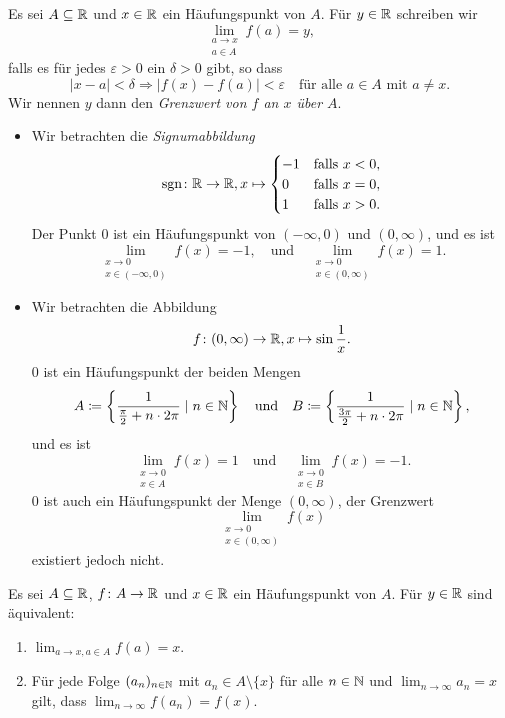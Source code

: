 \documentclass[a4paper,10pt]{article}
\begin{document}
\begin{defi}
 Es sei $A \subseteq \mathbb{R}$ und $x \in \mathbb{R}$ ein Häufungspunkt von $A$. Für $y \in \mathbb{R}$ schreiben wir
 \[
  \lim_{\substack{a \to x \\ a \in A}} f(a) = y,
 \]
 falls es für jedes $\varepsilon > 0$ ein $\delta > 0$ gibt, so dass
 \[
  |x-a| < \delta \Rightarrow |f(x)-f(a)| < \varepsilon
  \quad
  \text{für alle $a \in A$ mit $a \neq x$}.
 \]
 Wir nennen $y$ dann den \emph{Grenzwert von $f$ an $x$ über $A$}.
\end{defi}


\begin{bsp}
 \begin{itemize}
  \item
   Wir betrachten die \emph{Signumabbildung}
   \[
    \operatorname{sgn} \colon \mathbb{R} \to \mathbb{R},
    x \mapsto
    \begin{cases}
     -1 & \text{falls $x < 0$}, \\
      0 & \text{falls $x = 0$}, \\
      1 & \text{falls $x > 0$}.
    \end{cases}
   \]
   Der Punkt $0$ ist ein Häufungspunkt von $(-\infty,0)$ und $(0,\infty)$, und es ist
   \[
    \lim_{\substack{x \to 0 \\ x \in (-\infty, 0)}} f(x) = -1,
    \quad
    \text{und}
    \quad
    \lim_{\substack{x \to 0 \\ x \in (0, \infty)}} f(x) = 1.
   \]
  \item
   Wir betrachten die Abbildung
   \[
    f \colon (0,\infty) \to \mathbb{R}, x \mapsto \sin \frac{1}{x}.
   \]
   $0$ ist ein Häufungspunkt der beiden Mengen
   \[
    A \coloneqq \left\{ \frac{1}{\frac{\pi}{2} + n \cdot 2\pi} \mid n \in \mathbb{N} \right\}
    \quad
    \text{und}
    \quad
    B \coloneqq \left\{ \frac{1}{\frac{3\pi}{2} + n \cdot 2\pi} \mid n \in \mathbb{N} \right\},
   \]
   und es ist
   \[
    \lim_{\substack{x \to 0 \\ x \in A}} f(x) = 1
    \quad
    \text{und}
    \quad
    \lim_{\substack{x \to 0 \\ x \in B}} f(x) = -1.
   \]
   $0$ ist auch ein Häufungspunkt der Menge $(0,\infty)$, der Grenzwert
   \[
    \lim_{\substack{x \to 0 \\ x \in (0,\infty)}} f(x)
   \]
   existiert jedoch nicht.
 \end{itemize}
\end{bsp}


\begin{lem}
 Es sei $A \subseteq \mathbb{R}$, $f \colon A \to \mathbb{R}$ und $x \in \mathbb{R}$ ein Häufungspunkt von $A$. Für $y \in \mathbb{R}$ sind äquivalent:
 \begin{enumerate}
  \item
   $\lim_{a \to x, a \in A} f(a) = x$.
  \item
   Für jede Folge $(a_n)_{n \in \mathbb{N}}$ mit $a_n \in A \setminus \{x\}$ für alle $n \in \mathbb{N}$ und $\lim_{n \to \infty} a_n = x$ gilt, dass $\lim_{n \to \infty} f(a_n) = f(x)$.
 \end{enumerate}
\end{lem}
\end{document}

